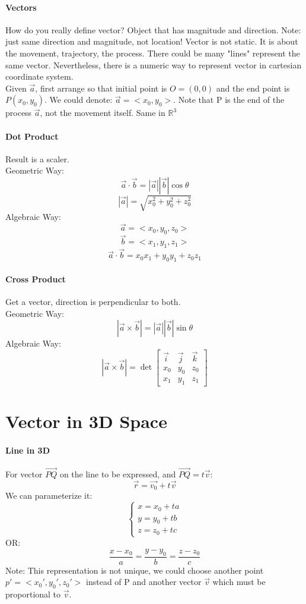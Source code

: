 \documentclass[11pt, oneside]{article}   	%
\begin{document}
\paragraph{Vectors}
How do you really define vector? Object that has magnitude and direction. Note: just same direction and magnitude, not location! Vector is not static. It is about the movement, trajectory, the process. There could be many "lines" represent the same vector. Nevertheless, there is a numeric way to represent vector in cartesian coordinate system. \\
Given $\vec{a}$, first arrange so that initial point is $O = (0,0)$ and the end point is $P(x_0,y_0)$. We could denote: $\vec{a} = <x_0, y_0>$. Note that P is the end of the process $\vec{a}$, not the movement itself. Same in $\mathbb{R}^3$

\paragraph{Dot Product}
Result is a scaler.\\
Geometric Way: 
$$\vec{a} \cdot \vec{b} = |\vec{a}| |\vec{b}| \cos \theta$$ 
$$|\vec{a}| = \sqrt{x_0^2+y_0^2+z_0^2}$$
Algebraic Way:
$$\vec{a} = <x_0, y_0, z_0>$$ 
$$\vec{b} = <x_1, y_1, z_1>$$
$$\vec{a} \cdot \vec{b} = x_0x_1+y_0y_1+z_0z_1$$

\paragraph{Cross Product}
Get a vector, direction is perpendicular to both.\\
Geometric Way:
$$|\vec{a} \times \vec{b}| = |\vec{a}| |\vec{b}| \sin \theta$$ 
Algebraic Way:
$$|\vec{a} \times \vec{b}| = \det \begin{bmatrix} \vec{i} & \vec{j} & \vec{k} \\ x_0 & y_0 & z_0 \\ x_1 & y_1 & z_1 \end{bmatrix}$$

\section{Vector in 3D Space}
\paragraph{Line in 3D}
For vector $\vec{PQ}$ on the line to be expressed, and $\vec{PQ} = t\vec{v}$: 
$$\vec{r} = \vec{v_0} + t\vec{v}$$
We can parameterize it:
\begin{equation}
  \begin{cases}
    x = x_0 + ta\\
    y = y_0 + tb\\
    z=  z_0 + tc
  \end{cases}
\end{equation}
OR:
$$\frac{x-x_0}{a}=\frac{y-y_0}{b}=\frac{z-z_0}{c}$$
Note: This representation is not unique, we could choose another point $p' = <x_0', y_0', z_0'>$ instead of P and another vector $\vec{v}$ which must be proportional to $\vec{v}$.
\end{document}
